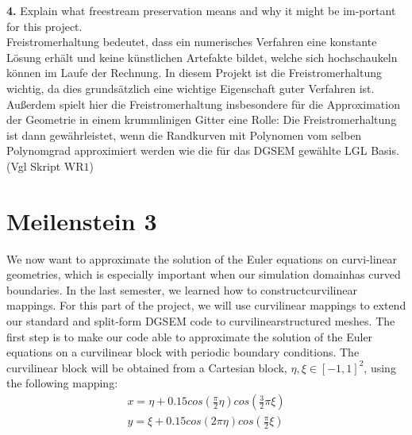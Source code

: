 \documentclass[11pt]{scrartcl}
\begin{document}
\textbf{4.} Explain what freestream preservation means and why it might be im-portant for this project. \\
Freistromerhaltung bedeutet, dass ein numerisches Verfahren eine konstante Lösung erhält und keine künstlichen Artefakte bildet, welche sich hochschaukeln können im Laufe der Rechnung. In diesem Projekt ist die Freistromerhaltung wichtig, da dies grundsätzlich eine wichtige Eigenschaft guter Verfahren ist. Außerdem spielt hier die Freistromerhaltung insbesondere für die Approximation der Geometrie in einem krummlinigen Gitter eine Rolle: Die Freistromerhaltung ist dann gewährleistet, wenn die Randkurven mit Polynomen vom selben Polynomgrad approximiert werden wie die für das DGSEM gewählte LGL Basis. (Vgl Skript WR$1$) 

\newpage
\section{Meilenstein 3}
We now want to approximate the solution of the Euler equations on curvi-linear geometries, which is especially important when our simulation domainhas curved boundaries. In the last semester, we learned how to constructcurvilinear mappings. For this part of the project, we will use curvilinear mappings to extend our standard and split-form DGSEM code to curvilinearstructured meshes. The first step is to make our code able to approximate the solution of the Euler equations on a curvilinear block with periodic boundary conditions. The curvilinear block will be obtained from a Cartesian block, $ \eta, \xi \in [-1, 1]^2$, using the following mapping:
\begin{align*}
x = \eta + 0.15 cos\left(\frac{\pi}{2}\eta \right)cos\left(\frac{3}{2}\pi \xi \right) \\
y = \xi + 0.15 cos\left(2\pi \eta \right) cos\left(\frac{\pi}{2}\xi \right)
\end{align*}
\end{document}
